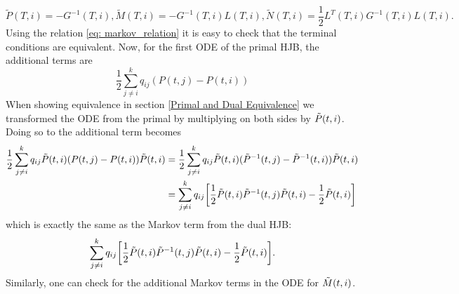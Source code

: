 \begin{equation*}
    \tilde{P}(T,i) = -G^{-1}(T,i),  \tilde{M}(T,i) = - G^{-1}(T,i)L(T,i),  \tilde{N}(T,i) = \frac12 L^T(T,i)G^{-1}(T,i)L(T,i).
\end{equation*}
Using the relation \eqref{eq: markov_relation} it is easy to check that the terminal conditions are equivalent. Now, for the first ODE of the primal HJB, the additional terms are 
\begin{equation*}
    \frac12 \sum_{j \ne i}^k q_{ij} (P(t,j) - P(t,i))
\end{equation*}
When showing equivalence in section \ref{Primal and Dual Equivalence} we transformed the ODE from the primal by multiplying on both sides by $\Tilde{P}(t, i)$. Doing so to the additional term becomes
\begin{align*}
    \frac12 \sum_{j \ne i}^k q_{ij} \Tilde{P}(t,i)(P(t,j) - P(t,i)) \Tilde{P}(t,i) &=  \frac12 \sum_{j \ne i}^k q_{ij} \Tilde{P}(t,i)(\tilde{P}^{-1}(t,j) - \tilde{P}^{-1}(t,i)) \Tilde{P}(t,i)\\
    &= \sum_{j\ne i}^k q_{ij} \bigg[\frac12 \Tilde{P}(t,i) \Tilde{P}^{-1}(t,j) \Tilde{P}(t,i) - \frac12 \tilde{P}(t,i)\bigg] 
\end{align*}
which is exactly the same as the Markov term from the dual HJB:
\begin{align*}
    \sum_{j\ne i}^k q_{ij} \bigg[\frac12 \Tilde{P}(t,i) \Tilde{P}^{-1}(t,j) \Tilde{P}(t,i) - \frac12 \tilde{P}(t,i)\bigg].
\end{align*}
Similarly, one can check for the additional Markov terms in the ODE for $\Tilde{M}(t,i)$. 